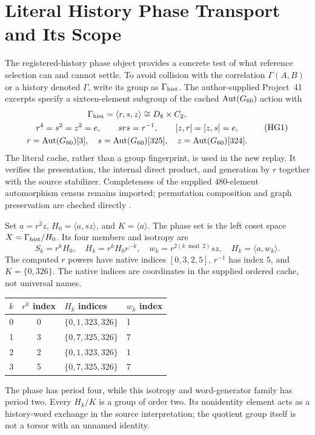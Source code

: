 \begingroup
\renewcommand{\thesection}{16A}
\section{Literal History Phase Transport and Its Scope}\label{sec:historyphasegroupoid}
The registered-history phase object provides a concrete test of what reference selection can and cannot settle. To avoid collision with the correlation $\Gamma(A,B)$ or a history denoted $\Gamma$, write its group as $\Gamma_{\rm hist}$. The author-supplied Project~41 excerpts specify a sixteen-element subgroup of the cached $\operatorname{Aut}(G_{60})$ action with
\begin{equation}
\begin{gathered}
\Gamma_{\rm hist}=\langle r,s,z\rangle\cong D_8\times C_2,\\
r^4=s^2=z^2=e,\qquad srs=r^{-1},\qquad [z,r]=[z,s]=e,\\
r=\operatorname{Aut}(G_{60})[3],\quad s=\operatorname{Aut}(G_{60})[325],\quad z=\operatorname{Aut}(G_{60})[324].
\end{gathered}
\tag{HG1}\label{eq:historygrouppresentation}
\end{equation}
The literal cache, rather than a group fingerprint, is used in the new replay. It verifies the presentation, the internal direct product, and generation by $r$ together with the source stabilizer. Completeness of the supplied 480-element automorphism census remains imported; permutation composition and graph preservation are checked directly \citep{cave2026nativepacket,cave2026p4receipts,cave2026draft6replays}.

Set $a=r^2z$, $H_0=\langle a,sz\rangle$, and $K=\langle a\rangle$. The phase set is the left coset space $X=\Gamma_{\rm hist}/H_0$. Its four members and isotropy are
\begin{equation}
S_k=r^kH_0,\quad H_k=r^kH_0r^{-k},\quad
w_k=r^{2(k\bmod2)}sz,\quad H_k=\langle a,w_k\rangle.
\tag{HG2}\label{eq:historyphasecosets}
\end{equation}
The computed $r$ powers have native indices $[0,3,2,5]$, $r^{-1}$ has index $5$, and $K=\{0,326\}$. The native indices are coordinates in the supplied ordered cache, not universal names.

\begin{center}
\small
\begin{tabular}{@{}ccll@{}}
\toprule
$k$ & $r^k$ index & $H_k$ indices & $w_k$ index \\
\midrule
0 & 0 & $\{0,1,323,326\}$ & 1 \\
1 & 3 & $\{0,7,325,326\}$ & 7 \\
2 & 2 & $\{0,1,323,326\}$ & 1 \\
3 & 5 & $\{0,7,325,326\}$ & 7 \\
\bottomrule
\end{tabular}
\end{center}
The phase has period four, while this isotropy and word-generator family has period two. Every $H_k/K$ is a group of order two. Its nonidentity element acts as a history-word exchange in the source interpretation; the quotient group itself is not a torsor with an unnamed identity.

